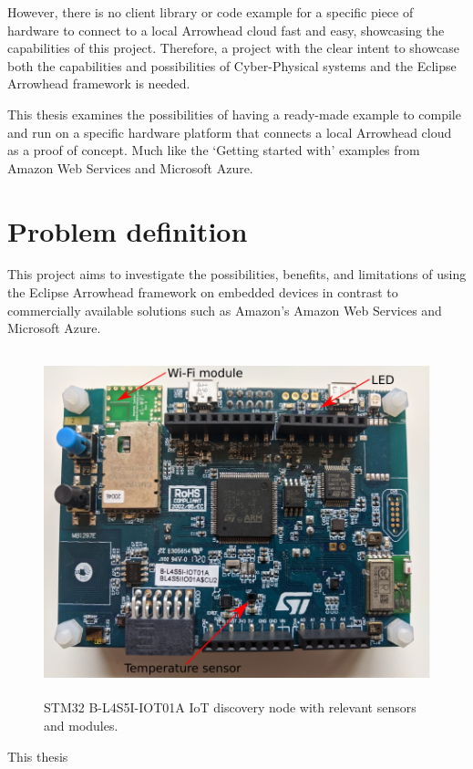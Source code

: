 However, there is no client library or code example for a specific piece of hardware to connect to a local Arrowhead cloud fast and easy, showcasing the capabilities of this project. 
Therefore, a project with the clear intent to showcase both the capabilities and possibilities of Cyber-Physical systems and the Eclipse Arrowhead framework is needed.

This thesis examines the possibilities of having a ready-made example to compile and run on a specific hardware platform that connects a local Arrowhead cloud as a proof of concept. 
Much like the ‘Getting started with’ examples from Amazon Web Services and Microsoft Azure.\cite{Guide2020,AZURE2021}
\section{Problem definition}
This project aims to investigate the possibilities, benefits, and limitations of using the Eclipse Arrowhead framework on embedded devices in contrast to commercially available solutions such
as Amazon’s Amazon Web Services and Microsoft Azure. 
\begin{figure}[h!]
    \centering
    \includegraphics[width=\textwidth, height=10cm]{Pictures/board.pdf} 
    \caption{STM32 B-L4S5I-IOT01A IoT discovery node with relevant sensors and modules.}
    \label{STM32 B-L4S5I-IOT01A IoT discovery node}
\end{figure}
This thesis 
\newpage

